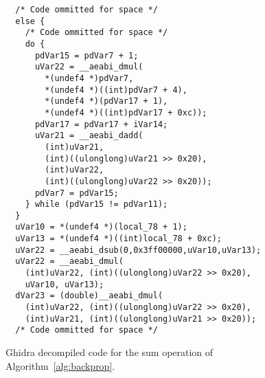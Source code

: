 \lstset{language=C}
\lstset{basicstyle=\ttfamily\scriptsize}
\lstset{showstringspaces=false}
\lstset{breaklines=true}
\lstset{breakatwhitespace=true}
\lstset{tabsize=2}
\lstset{numbers=left}
\lstset{numbersep=5pt}
\lstset{frame=single}
\lstset{captionpos=b}

\begin{figure}
  \begin{lstlisting}
  /* Code ommitted for space */
  else {
    /* Code ommitted for space */
    do {
      pdVar15 = pdVar7 + 1;
      uVar22 = __aeabi_dmul(
        *(undef4 *)pdVar7,
        *(undef4 *)((int)pdVar7 + 4),
        *(undef4 *)(pdVar17 + 1),
        *(undef4 *)((int)pdVar17 + 0xc));
      pdVar17 = pdVar17 + iVar14;
      uVar21 = __aeabi_dadd(
        (int)uVar21,
        (int)((ulonglong)uVar21 >> 0x20),
        (int)uVar22,
        (int)((ulonglong)uVar22 >> 0x20));
      pdVar7 = pdVar15;
    } while (pdVar15 != pdVar11);
  }
  uVar10 = *(undef4 *)(local_78 + 1);
  uVar13 = *(undef4 *)((int)local_78 + 0xc);
  uVar22 = __aeabi_dsub(0,0x3ff00000,uVar10,uVar13);
  uVar22 = __aeabi_dmul(
    (int)uVar22, (int)((ulonglong)uVar22 >> 0x20),
    uVar10, uVar13);
  dVar23 = (double)__aeabi_dmul(
    (int)uVar22, (int)((ulonglong)uVar22 >> 0x20),
    (int)uVar21, (int)((ulonglong)uVar21 >> 0x20));
  /* Code ommitted for space */
\end{lstlisting}
	\caption{Ghidra decompiled code for the sum operation of Algorithm~\ref{alg:backprop}.}
	\label{fig:ann-decomp}
\end{figure}
